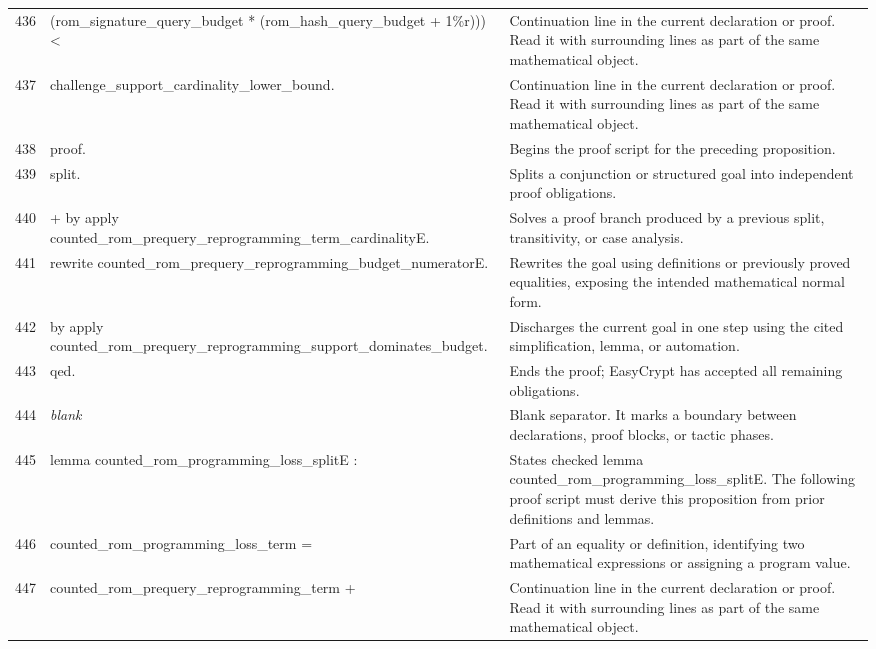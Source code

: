 \documentclass[10pt]{article}
\begin{document}
\begin{longtable}{r L{0.53\textwidth} L{0.37\textwidth}}
436 & {\ttfamily\scriptsize    (rom\_signature\_query\_budget * (rom\_hash\_query\_budget + 1\%r))) <} & Continuation line in the current declaration or proof.  Read it with surrounding lines as part of the same mathematical object. \\
437 & {\ttfamily\scriptsize   challenge\_support\_cardinality\_lower\_bound.} & Continuation line in the current declaration or proof.  Read it with surrounding lines as part of the same mathematical object. \\
438 & {\ttfamily\scriptsize proof.} & Begins the proof script for the preceding proposition. \\
439 & {\ttfamily\scriptsize split.} & Splits a conjunction or structured goal into independent proof obligations. \\
440 & {\ttfamily\scriptsize + by apply counted\_rom\_prequery\_reprogramming\_term\_cardinalityE.} & Solves a proof branch produced by a previous split, transitivity, or case analysis. \\
441 & {\ttfamily\scriptsize rewrite counted\_rom\_prequery\_reprogramming\_budget\_numeratorE.} & Rewrites the goal using definitions or previously proved equalities, exposing the intended mathematical normal form. \\
442 & {\ttfamily\scriptsize by apply counted\_rom\_prequery\_reprogramming\_support\_dominates\_budget.} & Discharges the current goal in one step using the cited simplification, lemma, or automation. \\
443 & {\ttfamily\scriptsize qed.} & Ends the proof; EasyCrypt has accepted all remaining obligations. \\
444 & {\ttfamily\scriptsize \emph{blank}} & Blank separator.  It marks a boundary between declarations, proof blocks, or tactic phases. \\
445 & {\ttfamily\scriptsize lemma counted\_rom\_programming\_loss\_splitE :} & States checked lemma counted\_rom\_programming\_loss\_splitE.  The following proof script must derive this proposition from prior definitions and lemmas. \\
446 & {\ttfamily\scriptsize   counted\_rom\_programming\_loss\_term =} & Part of an equality or definition, identifying two mathematical expressions or assigning a program value. \\
447 & {\ttfamily\scriptsize     counted\_rom\_prequery\_reprogramming\_term +} & Continuation line in the current declaration or proof.  Read it with surrounding lines as part of the same mathematical object. \\

\end{longtable}
\end{document}
